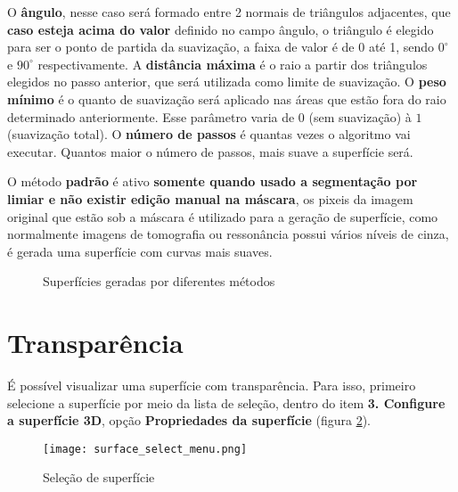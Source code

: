 O \textbf{ângulo}, nesse caso será formado entre 2 normais de triângulos adjacentes, que \textbf{caso esteja acima do valor} definido no campo ângulo, o triângulo é elegido para ser o ponto de partida da suavização, a faixa de valor é de 0 até 1, sendo $0^\circ$ e $90^\circ$ respectivamente. A \textbf{distância máxima} é o raio a partir dos triângulos elegidos no passo anterior, que será utilizada como limite de suavização. O \textbf{peso mínimo} é o quanto de suavização será aplicado nas áreas que estão fora do raio determinado anteriormente. Esse parâmetro varia de $0$ (sem suavização) à $1$ (suavização total). O \textbf{número de passos} é quantas vezes o algoritmo vai executar. Quantos maior o número de passos, mais suave a superfície será.

O método \textbf{padrão} é ativo \textbf{somente quando usado a segmentação por limiar e não existir edição manual na máscara}, os pixeis da imagem original que estão sob a máscara é utilizado para a geração de superfície, como normalmente imagens de tomografia ou ressonância possui vários níveis de cinza, é gerada uma superfície com curvas mais suaves.

\begin{figure}[!htb]
  \centering
  \hfill
  \hfill  
  \caption{Superfícies geradas por diferentes métodos }
  \label{fig:surf_method}
\end{figure}



\section{Transparência}

É possível visualizar uma superfície com transparência. Para isso, primeiro selecione a
superfície por meio da lista de seleção, dentro do item \textbf{3. Configure a superfície 3D}, opção
\textbf{Propriedades da superfície} (figura \ref{fig:select_surface}).

\begin{figure}[!htb]
\centering
\texttt{[image: surface\_select\_menu.png]}
\caption{Seleção de superfície}
\label{fig:select_surface}
\end{figure}

